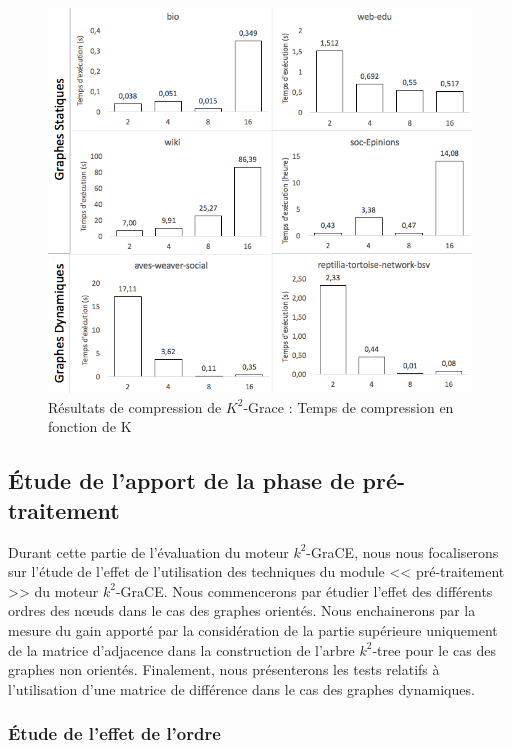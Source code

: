 \begin{figure}[H]
	\centering
	\includegraphics[scale=0.6]{ressources/image/Tests/K2-Texec.png}
	
	\caption{Résultats de compression de $K^2$-Grace : Temps de compression en fonction de K}
	\label{fig:K2-Texec}
\end{figure}


			
			
 \subsection{Étude de l'apport de la phase de pré-traitement }
 
 Durant cette partie de l'évaluation du moteur $k^2$-GraCE, nous nous focaliserons sur l'étude de l'effet de l'utilisation des techniques du module << pré-traitement >> du moteur $k^2$-GraCE. Nous commencerons par étudier l'effet des différents ordres des nœuds dans le cas des graphes orientés. Nous enchainerons par la mesure du gain apporté par la considération de la partie supérieure uniquement de la matrice d'adjacence dans la construction de l'arbre $k^2$-tree pour le cas des graphes non orientés. Finalement, nous présenterons les tests relatifs à l'utilisation d'une matrice de différence dans le cas des graphes dynamiques.
 			
\subsubsection{Étude de l'effet de l'ordre}

